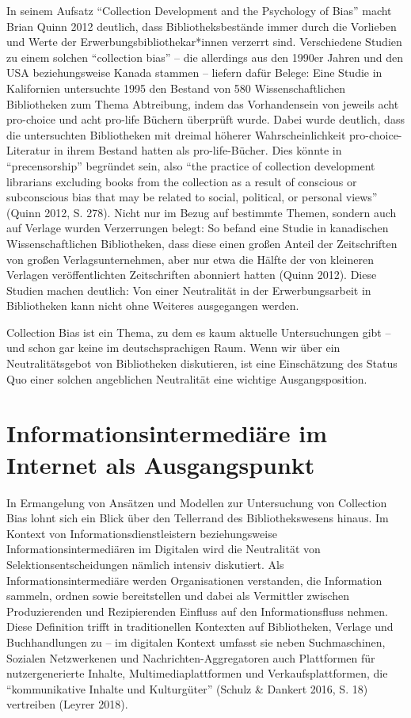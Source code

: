\documentclass[a4paper,
fontsize=11pt,
oneside,
numbers=noperiodatend,
parskip=half-,
bibliography=totoc,
final
]{scrartcl}
\begin{document}
In seinem Aufsatz \enquote{Collection Development and the Psychology of
Bias} macht Brian Quinn 2012 deutlich, dass Bibliotheksbestände immer
durch die Vorlieben und Werte der Erwerbungsbibliothekar*innen verzerrt
sind. Verschiedene Studien zu einem solchen \enquote{collection bias} --
die allerdings aus den 1990er Jahren und den USA beziehungsweise Kanada
stammen -- liefern dafür Belege: Eine Studie in Kalifornien untersuchte
1995 den Bestand von 580 Wissenschaftlichen Bibliotheken zum Thema
Abtreibung, indem das Vorhandensein von jeweils acht pro-choice und acht
pro-life Büchern überprüft wurde. Dabei wurde deutlich, dass die
untersuchten Bibliotheken mit dreimal höherer Wahrscheinlichkeit
pro-choice-Literatur in ihrem Bestand hatten als pro-life-Bücher. Dies
könnte in \enquote{precensorship} begründet sein, also \enquote{the
practice of collection development librarians excluding books from the
collection as a result of conscious or subconscious bias that may be
related to social, political, or personal views} (Quinn 2012, S. 278).
Nicht nur im Bezug auf bestimmte Themen, sondern auch auf Verlage wurden
Verzerrungen belegt: So befand eine Studie in kanadischen
Wissenschaftlichen Bibliotheken, dass diese einen großen Anteil der
Zeitschriften von großen Verlagsunternehmen, aber nur etwa die Hälfte
der von kleineren Verlagen veröffentlichten Zeitschriften abonniert
hatten (Quinn 2012). Diese Studien machen deutlich: Von einer
Neutralität in der Erwerbungsarbeit in Bibliotheken kann nicht ohne
Weiteres ausgegangen werden.

Collection Bias ist ein Thema, zu dem es kaum aktuelle Untersuchungen
gibt -- und schon gar keine im deutschsprachigen Raum. Wenn wir über ein
Neutralitätsgebot von Bibliotheken diskutieren, ist eine Einschätzung
des Status Quo einer solchen angeblichen Neutralität eine wichtige
Ausgangsposition.

\hypertarget{informationsintermediuxe4re-im-internet-als-ausgangspunkt}{%
\section{Informationsintermediäre im Internet als
Ausgangspunkt}\label{informationsintermediuxe4re-im-internet-als-ausgangspunkt}}

In Ermangelung von Ansätzen und Modellen zur Untersuchung von Collection
Bias lohnt sich ein Blick über den Tellerrand des Bibliothekswesens
hinaus. Im Kontext von Informationsdienstleistern beziehungsweise
Informationsintermediären im Digitalen wird die Neutralität von
Selektionsentscheidungen nämlich intensiv diskutiert. Als
Informationsintermediäre werden Organisationen verstanden, die
Information sammeln, ordnen sowie bereitstellen und dabei als Vermittler
zwischen Produzierenden und Rezipierenden Einfluss auf den
Informationsfluss nehmen. Diese Definition trifft in traditionellen
Kontexten auf Bibliotheken, Verlage und Buchhandlungen zu -- im
digitalen Kontext umfasst sie neben Suchmaschinen, Sozialen Netzwerkenen
und Nachrichten-Aggregatoren auch Plattformen für nutzergenerierte
Inhalte, Multimediaplattformen und Verkaufsplattformen, die
\enquote{kommunikative Inhalte und Kulturgüter} (Schulz \& Dankert 2016,
S. 18) vertreiben (Leyrer 2018).
\end{document}
